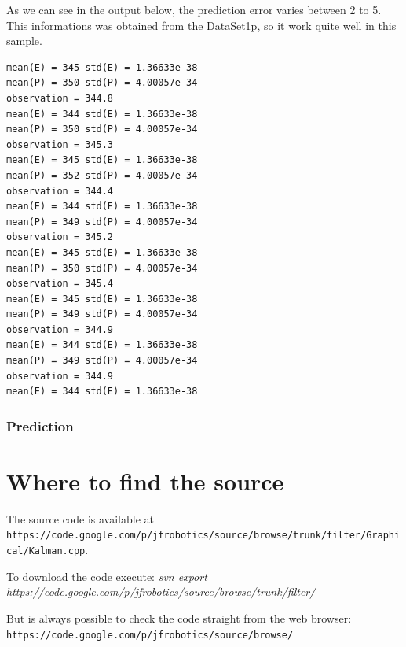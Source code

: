 \documentclass{article}
\begin{document}
As we can see in the output below, the prediction error varies between 2 to 5. This informations was obtained from the DataSet1p, so it work quite well in this sample.

\begin{lstlisting}
mean(E) = 345 std(E) = 1.36633e-38
mean(P) = 350 std(P) = 4.00057e-34
observation = 344.8
mean(E) = 344 std(E) = 1.36633e-38
mean(P) = 350 std(P) = 4.00057e-34
observation = 345.3
mean(E) = 345 std(E) = 1.36633e-38
mean(P) = 352 std(P) = 4.00057e-34
observation = 344.4
mean(E) = 344 std(E) = 1.36633e-38
mean(P) = 349 std(P) = 4.00057e-34
observation = 345.2
mean(E) = 345 std(E) = 1.36633e-38
mean(P) = 350 std(P) = 4.00057e-34
observation = 345.4
mean(E) = 345 std(E) = 1.36633e-38
mean(P) = 349 std(P) = 4.00057e-34
observation = 344.9
mean(E) = 344 std(E) = 1.36633e-38
mean(P) = 349 std(P) = 4.00057e-34
observation = 344.9
mean(E) = 344 std(E) = 1.36633e-38
\end{lstlisting}

\subsubsection{Prediction}

\section{Where to find the source}

The source code is available at \texttt{https://code.google.com/p/jfrobotics/source/browse/trunk/filter/Graphical/Kalman.cpp}.

To download the code execute:
\textit{svn export https://code.google.com/p/jfrobotics/source/browse/trunk/filter/}

But is always possible to check the code straight from the web browser:
\texttt{https://code.google.com/p/jfrobotics/source/browse/}
\end{document}
